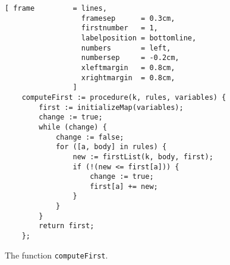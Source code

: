 \begin{figure}[!ht]
\centering
\begin{Verbatim}[ frame         = lines, 
                  framesep      = 0.3cm, 
                  firstnumber   = 1,
                  labelposition = bottomline,
                  numbers       = left,
                  numbersep     = -0.2cm,
                  xleftmargin   = 0.8cm,
                  xrightmargin  = 0.8cm,
                ]
    computeFirst := procedure(k, rules, variables) {
        first := initializeMap(variables);
        change := true;
        while (change) {
            change := false;    
            for ([a, body] in rules) {
                new := firstList(k, body, first);
                if (!(new <= first[a])) { 
                    change := true;
                    first[a] += new;
                }
            }
        }
        return first;
    };
\end{Verbatim}
\vspace*{-0.3cm}
\caption{The function \texttt{computeFirst}.}
\label{fig:llk.stlx:computeFirst}
\end{figure}
